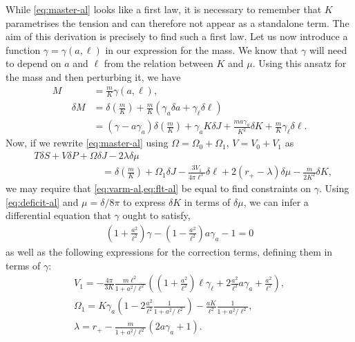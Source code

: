 \documentclass[
twoside,
openright,
frontopenright,
]{dmathesis}
\newcommand{\nn}{\nonumber}
\begin{document}
While \cref{eq:master-al} looks like a first law, it is necessary to remember
that $K$ parametrises the tension and can therefore not appear as a standalone
term. The aim of this derivation is precisely to find such a first law. Let us
now introduce a function $\gamma = \gamma(a,\ell)$ in our expression for the
mass. We know that $\gamma$ will need to depend on $a$ and $\ell$ from the
relation between $K$ and $\mu$. Using this ansatz for the mass and then perturbing
it, we have
\begin{align}  
  M&=\frac{m}{K}\gamma(a,\ell),\\
  \qquad \delta M &= \delta \left(\frac{m}{K}\right) +\frac{m}{K}(\gamma_{a}
                    \delta a + \gamma_{\ell}\delta\ell)\nn\\
   &= (\gamma - a\gamma_{a})\delta \left(\frac{m}{K}\right) +
     \gamma_{a}K\delta J + \frac{m a \gamma_{a}}{K^{2}}\delta K +
     \frac{m}{K}\gamma_{\ell}\delta \ell.
     \label{eq:varm-al}
\end{align}
Now, if we rewrite \cref{eq:master-al} using $\Omega = \Omega_0+\Omega_1$,
$V = V_0 + V_1$ as
\begin{align}
  \label{eq:flt-al}
  &T\delta S + V\delta P + \Omega \delta J - 2\lambda \delta \mu\nn\\
  &\hspace{7em}= \delta
  \left(\frac{m}{K}\right) + \Omega_1\delta J -\frac{3V_1}{4\pi \ell^3}\delta
  \ell + 2(r_+-\lambda)\delta\mu -\frac{m}{2K^2}\delta K,
\end{align}
we may require that \cref{eq:varm-al,eq:flt-al} be equal to find constraints on
$\gamma$. Using \cref{eq:deficit-al} and $\mu=\delta/8\pi$ to express $\delta K$
in terms of $\delta \mu$, we can infer a differential equation that $\gamma$
ought to satisfy,
\begin{align}\label{eq:eq1al}
\left(1+\frac{a^2}{\ell^2}\right)\gamma-
  \left(1-\frac{a^{2}}{\ell^{2}}\right)a\gamma_{a}-1=0 
\end{align}
as well as the following expressions for the correction terms, defining them in
terms of $\gamma$:
\begin{gather}
V_1=-\frac{4\pi}{3K}\frac{m
  \ell^2}{1+a^2/\ell^2}\left(\left(1+\frac{a^2}{\ell^2}\right)
  \ell\gamma_{\ell}+2\frac{a^2}{\ell^2}a
  \gamma_{a}+\frac{a^2}{\ell^2}\right),\nn\\  
\Omega_1=K\gamma_{a}\left(1-2\frac{a^2}{\ell^2}\frac{1}{1+a^2/\ell^2}\right)-
\frac{aK}{\ell^2}\frac{1}{1+a^2/\ell^2},\nn\\ 
\lambda=r_+-\frac{m}{1+a^2/\ell^2}\left(2a\gamma_{a}+1\right). 
\end{gather}
\end{document}
